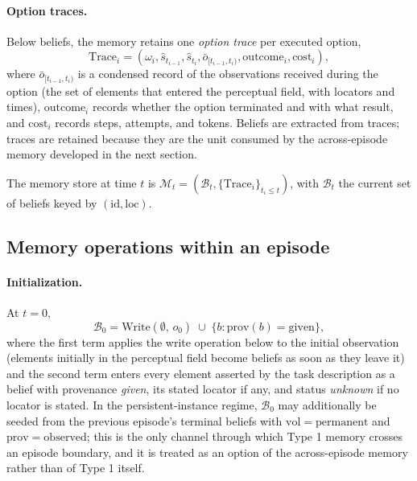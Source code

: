 \documentclass[11pt]{article}
\newcommand{\calM}{\mathcal{M}}
\newcommand{\calB}{\mathcal{B}}
\newcommand{\shat}{\hat{s}}
\newcommand{\Write}{\mathrm{Write}}
\newcommand{\Trace}{\mathrm{Trace}}
\newcommand{\loc}{\mathrm{loc}}
\newcommand{\prov}{\mathrm{prov}}
\newcommand{\vol}{\mathrm{vol}}
\newcommand{\id}{\mathrm{id}}
\begin{document}
\paragraph{Option traces.}
Below beliefs, the memory retains one \emph{option trace} per executed option,
\begin{equation}
\Trace_i=(\omega_i,\shat_{t_{i-1}},\shat_{t_i},\bar o_{[t_{i-1},t_i)},\mathrm{outcome}_i,\mathrm{cost}_i),
\label{eq:trace}
\end{equation}
where $\bar o_{[t_{i-1},t_i)}$ is a condensed record of the observations received during the option (the set of elements that entered the perceptual field, with locators and times), $\mathrm{outcome}_i$ records whether the option terminated and with what result, and $\mathrm{cost}_i$ records steps, attempts, and tokens. Beliefs are extracted from traces; traces are retained because they are the unit consumed by the across-episode memory developed in the next section.

The memory store at time $t$ is $\calM_t=(\calB_t,\{\Trace_i\}_{t_i\le t})$, with $\calB_t$ the current set of beliefs keyed by $(\id,\loc)$.

\subsection{Memory operations within an episode}
\label{sec:type1-ops}

\paragraph{Initialization.}
At $t=0$,
\begin{equation}
\calB_0=\Write(\emptyset,\,o_0)\;\cup\;\{b:\prov(b)=\mathrm{given}\},
\end{equation}
where the first term applies the write operation below to the initial observation (elements initially in the perceptual field become beliefs as soon as they leave it) and the second term enters every element asserted by the task description as a belief with provenance \emph{given}, its stated locator if any, and status \emph{unknown} if no locator is stated. In the persistent-instance regime, $\calB_0$ may additionally be seeded from the previous episode's terminal beliefs with $\vol=\mathrm{permanent}$ and $\prov=\mathrm{observed}$; this is the only channel through which Type 1 memory crosses an episode boundary, and it is treated as an option of the across-episode memory rather than of Type 1 itself.
\end{document}
